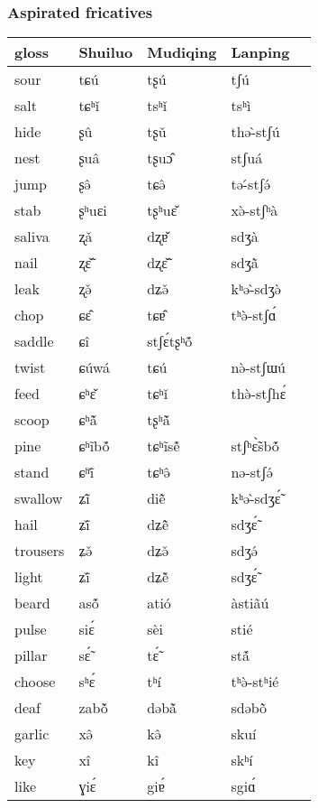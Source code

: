 \documentclass[xcolor=table]{beamer}
\newcommand{\ipa}[1]{{\phon \mbox{#1}}} %
\begin{document}
  \begin{frame} 
 \frametitle{Aspirated fricatives} 
\tiny
\begin{table}[H]
\centering
\begin{tabular}{lllll}
\toprule
gloss & 	Shuiluo & 	Mudiqing & 	Lanping \\ 	
\midrule
sour & 	\ipa{tɕú} & 	\ipa{tʂú} & 	\ipa{tʃú} \\ 	
salt & 	\ipa{tɕʰǐ} & 	\ipa{tsʰǐ} & 	\ipa{tsʰì} \\ 	
\midrule
hide & 	\ipa{ʂû} & 	\ipa{tʂǔ} & 	\ipa{thə-̀stʃú} \\ 	
nest & 	\ipa{ʂuâ} & 	\ipa{tʂuɔ̂} & 	\ipa{stʃuá} \\ 	
jump & 	\ipa{ʂə̂} & 	\ipa{tɕə̂} & 	\ipa{tə-́stʃə́} \\ 	
stab & 	\ipa{ʂʰuɛi} & 	\ipa{tʂʰuɛ̌} & 	\ipa{xə̀-stʃʰà} \\ 	
saliva & 	\ipa{ʐǎ} & 	\ipa{dʐɐ̌} & 	\ipa{sdʒà} \\ 	
nail & 	\ipa{ʐɛ̃̌} & 	\ipa{dʐɛ̃̌} & 	\ipa{sdʒã̀} \\ 	
leak & 	\ipa{ʐə̌} & 	\ipa{dʑə̌} & 	\ipa{kʰə-̀sdʒə̀} \\ 	
chop & 	\ipa{ɕɛ̂} & 	\ipa{tɕɐ̂} & 	\ipa{tʰə̀-stʃɑ́} \\ 	
saddle & 	\ipa{ɕî} & 	\ipa{stʃɛ́tʂʰṍ} & 	\ipa{} \\ 	
twist & 	\ipa{ɕúwá} & 	\ipa{tɕú} & 	\ipa{nə̀-stʃɯú} \\ 	
feed & 	\ipa{ɕʰɛ̌} & 	\ipa{tɕʰǐ} & 	\ipa{thə̀-stʃhɛ́} \\ 	
scoop & 	\ipa{ɕʰã̌} & 	\ipa{tʂʰã̌} & 	\ipa{} \\ 	
pine & 	\ipa{ɕʰĩbṍ} & 	\ipa{tɕʰĩsẽ́} & 	\ipa{stʃʰɛ̃̀sbṍ} \\ 	
stand & 	\ipa{ɕʰĩ̌} & 	\ipa{tɕʰə̂} & 	\ipa{nə-stʃə́} \\ 	
swallow & 	\ipa{ʑĩ̂} & 	\ipa{diẽ̂} & 	\ipa{kʰə-̀sdʒɛ̃́} \\ 	
hail & 	\ipa{ʑĩ̌} & 	\ipa{dʑẽ̂} & 	\ipa{sdʒɛ̃́} \\ 	
trousers & 	\ipa{ʑə̌} & 	\ipa{dʑə̌} & 	\ipa{sdʒə́} \\ 	
light & 	\ipa{ʑĩ̌} & 	\ipa{dʑẽ̌} & 	\ipa{sdʒɛ̃́} \\ 	
\midrule
beard & 	\ipa{asṍ} & 	\ipa{atió} & 	\ipa{àstiãú} \\ 	
pulse & 	\ipa{siɛ́} & 	\ipa{sèi} & 	\ipa{stié} \\ 	
pillar & 	\ipa{sɛ̃́} & 	\ipa{tɛ̃́} & 	\ipa{stã́} \\ 	
choose & 	\ipa{sʰɛ́} & 	\ipa{tʰí} & 	\ipa{tʰə̀-stʰié} \\ 	
deaf & 	\ipa{zabõ̌} & 	\ipa{dəbã̌} & 	\ipa{sdəbõ̀} \\ 	
\midrule
garlic & 	\ipa{xə̂} & 	\ipa{kə̂} & 	\ipa{skuí} \\ 	
key & 	\ipa{xî} & 	\ipa{kî} & 	\ipa{skʰí} \\ 	
like & 	\ipa{ɣiɛ́} & 	\ipa{giɐ́} & 	\ipa{sgiɑ́} \\ 	
\bottomrule
\end{tabular}
\end{table}
 \end{frame}   
 
\end{document}
